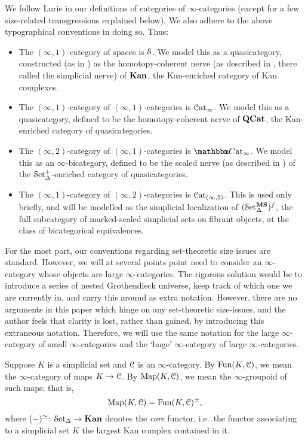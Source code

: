 \documentclass[main.tex]{subfiles}
\begin{document}
We follow Lurie in our definitions of categories of $\infty$-categories (except for a few size-related transgressions explained below). We also adhere to the above typographical conventions in doing so. Thus:
\begin{itemize}
  \item The $(\infty, 1)$-category of spaces is $\S$. We model this as a quasicategory, constructed (as in \cite{highertopostheory}) as the homotopy-coherent nerve (as described in \cite[Sec.~1.1.5]{highertopostheory}, there called the simplicial nerve) of $\Kan$, the Kan-enriched category of Kan complexes.

  \item The $(\infty, 1)$-category of $(\infty,1)$-categories is $\ICat$. We model this as a quasicategory, defined to be the homotopy-coherent nerve of $\QCat$, the Kan-enriched category of quasicategories.

  \item The $(\infty,2)$-category of $(\infty, 1)$-categories is $\ICCat$. We model this as an $\infty$-bicategory, defined to be the scaled nerve (as described in \cite[Sec.~3.1]{lurie2009infinity}) of the $\SSetmk$-enriched category of quasicategories.

  \item The $(\infty, 1)$-category of $(\infty,2)$-categories is $\Cat_{(\infty, 2)}$. This is used only briefly, and will be modelled as the simplicial localization of $(\SSetms)^{f}$, the full subcategory of marked-scaled simplicial sets on fibrant objects, at the class of bicategorical equivalences.
\end{itemize}

For the most part, our conventions regarding set-theoretic size issues are standard. However, we will at several points point need to consider an $\infty$-category whose objects are large $\infty$-categories. The rigorous solution would be to introduce a series of nested Grothendieck universe, keep track of which one we are currently in, and carry this around as extra notation. However, there are no arguments in this paper which hinge on any set-theoretic size-issues, and the author feels that clarity is lost, rather than gained, by introducing this extraneous notation. Therefore, we will use the same notation for the large $\infty$-category of small $\infty$-categories and the `huge' $\infty$-category of large $\infty$-categories.

Suppose $K$ is a simplicial set and $\category{C}$ is an $\infty$-category. By $\Fun(K, \category{C})$, we mean the $\infty$-category of maps $K \to \category{C}$. By $\Map(K, \category{C})$, we mean the $\infty$-groupoid of such maps; that is,
\begin{equation*}
  \Map(K, \category{C}) = \Fun(K, \category{C})^{\simeq},
\end{equation*}
where $(-)^{\simeq}\colon \SSet \to \Kan$ denotes the \emph{core} functor, i.e.\ the functor associating to a simplicial set $K$ the largest Kan complex contained in it.
\end{document}
